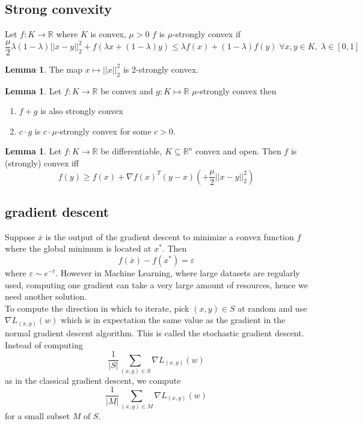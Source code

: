 \documentclass[a4paper, 12pt]{article}
\theoremstyle{plain}
\theoremstyle{definition}
\theoremstyle{lemma}
\newtheorem{lemma}[theorem]{Lemma}
\theoremstyle{remark}
\theoremstyle{example}
\begin{document}
	\subsection{Strong convexity}
	Let $f: K \to \mathbb{R}$ where $K$ is convex, $\mu>0$ $f$ is $\mu$-strongly convex if \[\frac{\mu}{2}\lambda(1-\lambda)||x-y||_2^2 + f(\lambda x + (1-\lambda)y) \leq \lambda f(x) + (1-\lambda)f(y) \; \forall x,y \in K, \; \lambda \in [0,1]\]
	\begin{lemma}
		The map $x\mapsto ||x||_2^2$ is 2-strongly convex.
	\end{lemma}
	\begin{lemma}
		Let $f:K \to \mathbb{R}$ be convex and $g: K \mapsto \mathbb{R}$ $\mu$-strongly convex then \begin{enumerate}
			\item $f+g$ is also strongly convex
			\item $c\cdot g$ is $c\cdot \mu$-strongly convex for some $c > 0$.
		\end{enumerate}
	\end{lemma}
	\begin{lemma}
		Let $f:K \to \mathbb{R}$ be differentiable, $K \subseteq \mathbb{R}^n$ convex and open. Then $f$ is (strongly) convex iff \[f(y) \geq f(x) + \nabla f(x)^T(y-x) (+\frac{\mu}{2}||x-y||_2^2)\]
	\end{lemma}
	\subsection{gradient descent}
	Suppose $\overline{x}$ is the output of the gradient descent to minimize a convex function $f$ where the global minimum is located at $x^*$. Then \[f(\overline{x}) - f(x^*) = \varepsilon\] where $\varepsilon \sim e^{-t}$. However in Machine Learning, where large datasets are regularly used, computing one gradient can take a very large amount of resources, hence we need another solution.\\
	To compute the direction in which to iterate, pick $(x,y) \in S$ at random and use $\nabla L_{(x,y)}(w)$ which is in expectation the same value as the gradient in the normal gradient descent algorithm. This is called the stochastic gradient descent. Instead of computing \[\frac{1}{\left|S\right|} \sum_{(x,y) \in S} \nabla L_{(x,y)}(w)\] as in the classical gradient descent, we compute \[\frac{1}{\left|M\right|} \sum_{(x,y) \in M} \nabla L_{(x,y)}(w)\] for a small subset $M$ of $S$.
\end{document}
